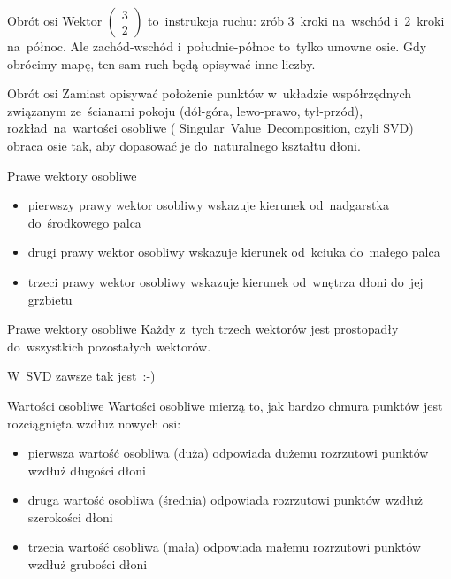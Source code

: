 \documentclass{beamer}
\begin{document}
  \begin{frame}{Obrót osi}
    Wektor $\begin{pmatrix}3 \\ 2\end{pmatrix}$ to~instrukcja ruchu:
      zrób 3~kroki na~wschód i~2~kroki na~północ. Ale {\g
        zachód-wschód} i~{\g południe-północ} to~tylko umowne osie.
      Gdy obrócimy mapę, ten sam ruch będą opisywać inne liczby.
  \end{frame}

  \begin{frame}{Obrót osi}
    Zamiast opisywać położenie punktów w~układzie współrzędnych
    związanym ze~ścianami pokoju ({dół-góra}, {lewo-prawo},
    {tył-przód}), {\g rozkład~na~wartości osobliwe} ({\g
      Singular~Value~Decomposition}, czyli {\g SVD}) obraca osie tak,
    aby dopasować je do~naturalnego kształtu dłoni.
  \end{frame}

  \begin{frame}{Prawe wektory osobliwe}
    \begin{itemize}
      \item {\g pierwszy prawy wektor osobliwy} wskazuje kierunek
        od~nadgarstka do~środkowego palca
      \item {\g drugi prawy wektor osobliwy} wskazuje kierunek
        od~kciuka do~małego palca
      \item {\g trzeci prawy wektor osobliwy} wskazuje kierunek
        od~wnętrza dłoni do~jej grzbietu
    \end{itemize}
  \end{frame}

  \begin{frame}{Prawe wektory osobliwe}
    Każdy z~tych trzech wektorów jest prostopadły do~wszystkich
    pozostałych wektorów.

    W~SVD zawsze tak jest~:-)
  \end{frame}

  \begin{frame}{Wartości osobliwe}
    Wartości osobliwe mierzą to, jak bardzo chmura punktów jest
    rozciągnięta wzdłuż nowych osi:
    \begin{itemize}
      \item {\g pierwsza wartość osobliwa} (duża) odpowiada dużemu
        rozrzutowi punktów wzdłuż długości dłoni
      \item {\g druga wartość osobliwa} (średnia) odpowiada rozrzutowi
        punktów wzdłuż szerokości dłoni
      \item {\g trzecia wartość osobliwa} (mała) odpowiada małemu
        rozrzutowi punktów wzdłuż grubości dłoni
    \end{itemize}
  \end{frame}
\end{document}
